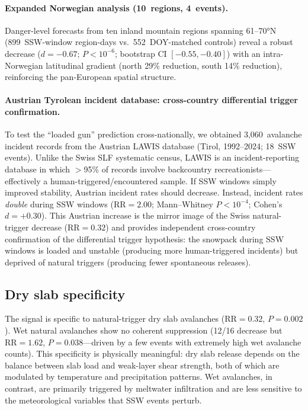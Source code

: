 \documentclass[11pt,letterpaper]{article}
\begin{document}
\paragraph{Expanded Norwegian analysis (10~regions, 4~events).} Danger-level forecasts from ten inland mountain regions spanning 61--70°N (899~SSW-window region-days vs.\ 552~DOY-matched controls) reveal a robust decrease ($d = -0.67$; $P < 10^{-6}$; bootstrap CI $[-0.55, -0.40]$) with an intra-Norwegian latitudinal gradient (north 29\% reduction, south 14\% reduction), reinforcing the pan-European spatial structure.

\paragraph{Austrian Tyrolean incident database: cross-country differential trigger confirmation.} To test the ``loaded gun'' prediction cross-nationally, we obtained 3,060~avalanche incident records from the Austrian LAWIS database (Tirol, 1992--2024; 18~SSW events). Unlike the Swiss SLF systematic census, LAWIS is an incident-reporting database in which $>$95\% of records involve backcountry recreationists---effectively a human-triggered/encountered sample. If SSW windows simply improved stability, Austrian incident rates should decrease. Instead, incident rates \emph{double} during SSW windows ($\mathrm{RR} = 2.00$; Mann--Whitney $P < 10^{-4}$; Cohen's $d = +0.30$). This Austrian increase is the mirror image of the Swiss natural-trigger decrease ($\mathrm{RR} = 0.32$) and provides independent cross-country confirmation of the differential trigger hypothesis: the snowpack during SSW windows is loaded and unstable (producing more human-triggered incidents) but deprived of natural triggers (producing fewer spontaneous releases).

\subsection*{Dry slab specificity}

The signal is specific to natural-trigger dry slab avalanches ($\mathrm{RR} = 0.32$, $P = 0.002$). Wet natural avalanches show no coherent suppression (12/16 decrease but $\mathrm{RR} = 1.62$, $P = 0.038$---driven by a few events with extremely high wet avalanche counts). This specificity is physically meaningful: dry slab release depends on the balance between slab load and weak-layer shear strength, both of which are modulated by temperature and precipitation patterns. Wet avalanches, in contrast, are primarily triggered by meltwater infiltration and are less sensitive to the meteorological variables that SSW events perturb.
\end{document}
